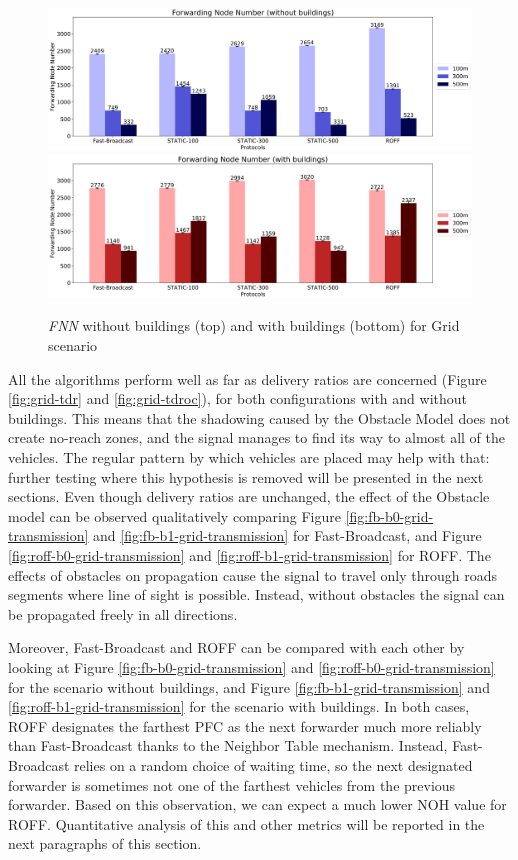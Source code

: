 		\begin{figure}[H]
			\centering
			\includegraphics[width=1.0\textwidth]{immagini/grid-300/b0/fnn}
			\includegraphics[width=1.0\textwidth]{immagini/grid-300/b1/fnn}
			\caption{\textit{FNN} without buildings (top) and with buildings (bottom) for Grid scenario}
			\label{fig:grid-fnn}
		\end{figure}
		
		\newpage
		
		All the algorithms perform well as far as delivery ratios are concerned (Figure \ref{fig:grid-tdr} and \ref{fig:grid-tdroc}), for both configurations with and without buildings. This means that the shadowing caused by the Obstacle Model does not create no-reach zones, and the signal manages to find its way to almost all of the vehicles. The regular pattern by which vehicles are placed may help with that: further testing where this hypothesis is removed will be presented in the next sections. Even though delivery ratios are unchanged, the effect of the Obstacle model can be observed qualitatively comparing Figure \ref{fig:fb-b0-grid-transmission} and \ref{fig:fb-b1-grid-transmission} for Fast-Broadcast, and Figure \ref{fig:roff-b0-grid-transmission} and \ref{fig:roff-b1-grid-transmission} for ROFF. The effects of obstacles on propagation cause the signal to travel only through roads segments where line of sight is possible. Instead, without obstacles the signal can be propagated freely in all directions.
		
		
		Moreover, Fast-Broadcast and ROFF can be compared with each other by looking at Figure \ref{fig:fb-b0-grid-transmission} and \ref{fig:roff-b0-grid-transmission} for the scenario without buildings, and Figure \ref{fig:fb-b1-grid-transmission} and \ref{fig:roff-b1-grid-transmission} for the scenario with buildings. In both cases, ROFF designates the farthest PFC as the next forwarder much more reliably than Fast-Broadcast thanks to the Neighbor Table mechanism. Instead, Fast-Broadcast relies on a random choice of waiting time, so the next designated forwarder is sometimes not one of the farthest vehicles from the previous forwarder. Based on this observation, we can expect a much lower NOH value for ROFF. Quantitative analysis of this and other metrics will be reported in the next paragraphs of this section.
		
